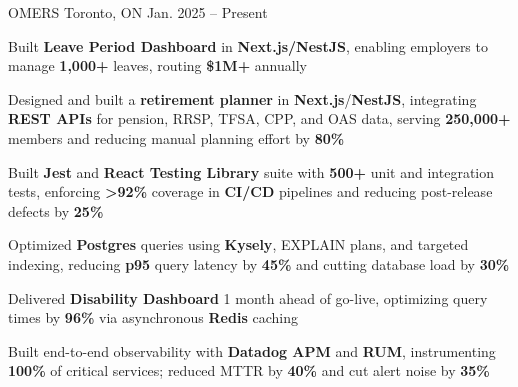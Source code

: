\documentclass[11pt, a4paper]{awesome-cv}
\begin{document}
\makecvheader[C]


\begin{cventries}


  \cventry
    {\color{lightblue}{ASSOCIATE FULL-STACK ENGINEER}}
    {OMERS}
    {Toronto, ON}
    {Jan. 2025 -- Present}
    {
      \begin{cvitems}
        \item{Built \textbf{Leave Period Dashboard} in \textbf{Next.js/NestJS}, enabling employers to manage \textbf{1,000+} leaves, routing \textbf{\$1M+} annually}
        \item{Designed and built a \textbf{retirement planner} in \textbf{Next.js}/\textbf{NestJS}, integrating \textbf{REST APIs} for pension, RRSP, TFSA, CPP, and OAS data, serving \textbf{250,000+} members and reducing manual planning effort by \textbf{80\%}}
        \item{Built \textbf{Jest} and \textbf{React Testing Library} suite with \textbf{500+} unit and integration tests, enforcing \textbf{>92\%} coverage in \textbf{CI/CD} pipelines and reducing post-release defects by \textbf{25\%}}
        \item{Optimized \textbf{Postgres} queries using \textbf{Kysely}, EXPLAIN plans, and targeted indexing, reducing \textbf{p95} query latency by \textbf{45\%} and cutting database load by \textbf{30\%}}
        \item{Delivered \textbf{Disability Dashboard} 1 month ahead of go-live, optimizing query times by \textbf{96\%} via asynchronous \textbf{Redis} caching}
        \item{Built end-to-end observability with \textbf{Datadog APM} and \textbf{RUM}, instrumenting \textbf{100\%} of critical services; reduced MTTR by \textbf{40\%} and cut alert noise by \textbf{35\%}}
      \end{cvitems}
    }

  \vspace{3mm}


\end{cventries}
\end{document}
